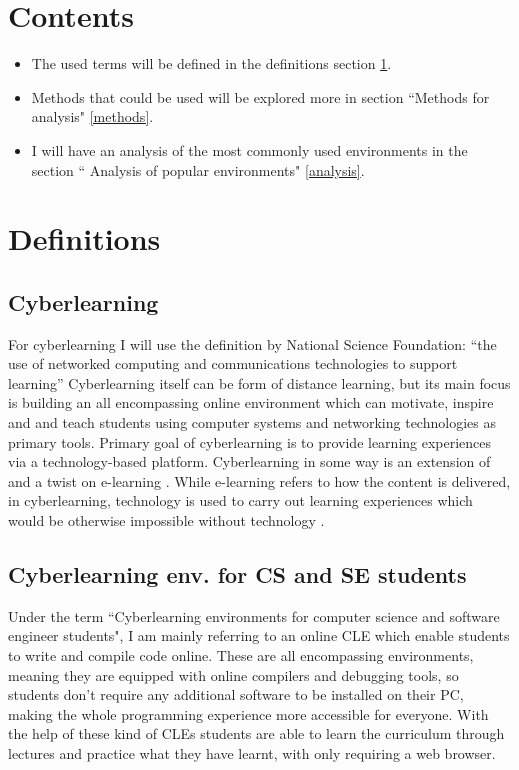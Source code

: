 \documentclass[10pt,english,a4paper]{article}
\begin{document}
\section*{Contents}

\begin{itemize}
     \item The used terms will be defined in the definitions section \ref{definitions}.
     \item Methods that could be used will be explored more in section ``Methods for analysis" \ref{methods}.
     \item I will have an analysis of the most commonly used environments in the section `` Analysis of popular environments" \ref{analysis}.
\end{itemize}


\section{Definitions}\label{definitions}

\subsection{Cyberlearning}
For cyberlearning I will use the definition by National Science Foundation: 
``the use of networked computing and communications technologies to support learning” \cite{borgman_2017_fostering} 
Cyberlearning itself can be form of distance learning, but its main focus is building an all 
encompassing online environment which can motivate, inspire and and teach students using 
computer systems and networking technologies as primary tools\cite{ui/ux}.
Primary goal of cyberlearning is to provide learning experiences via a technology-based platform. 
Cyberlearning in some way is an extension of and a twist on e-learning \cite{lynch_2020_cyberlearning}.
While e-learning refers to how the content is delivered, in cyberlearning, technology
is used to carry out learning experiences which would be otherwise impossible without technology \cite{lynch_2020_cyberlearning}.

\subsection{Cyberlearning env. for CS and SE students}
Under the term ``Cyberlearning environments for computer science and software engineer students", I am mainly
referring to an online CLE which enable students to write and compile code online. These are all encompassing
environments, meaning they are equipped with 
online compilers and debugging tools, so students don't require any additional software to be installed on their PC, making
the whole programming experience more accessible for everyone.
With the help of these kind of CLEs students are able to learn the curriculum through lectures and practice
what they have learnt, with only requiring a web browser.
\end{document}
